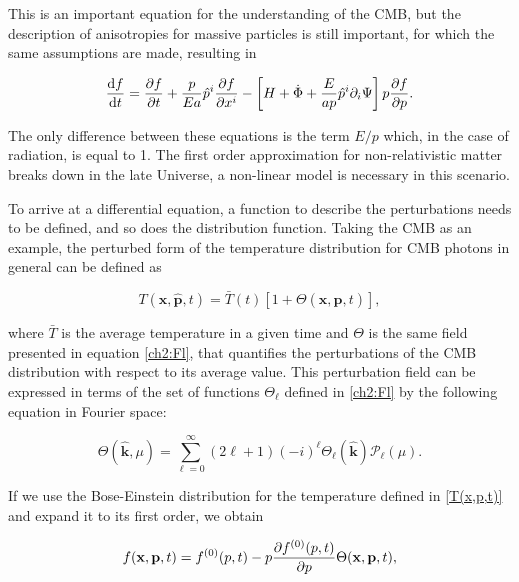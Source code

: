 \documentclass[openany,a4paper,12pt,oneside]{book}
\begin{document}
\begin{spacing}{1.5}
This is an important equation for the understanding of the CMB, but the description of anisotropies for massive particles is still important, for which the same assumptions are made, resulting in 

\begin{equation}\label{ch2:Boltzmann_matter_final}
    \dv{f}{t}=\pdv{f}{t}+\frac{p}{Ea}\hat{p}^i\pdv{f}{x^i}-\left[H+\dot{\Phi}+\frac{E}{ap}\hat{p}^i\partial_i\Psi\right]p\pdv{f}{p}.
\end{equation}

The only difference between these equations is the term $E/p$ which, in the case of radiation, is equal to 1. The first order approximation for non-relativistic matter breaks down in the late Universe, a non-linear model is necessary in this scenario. 

To arrive at a differential equation, a function to describe the perturbations needs to be defined, and so does the distribution function. Taking the CMB as an example, the perturbed form of the temperature distribution for CMB photons in general can be defined as

\begin{equation}\label{T(x,p,t)}
    T(\mathbf{x}, \hat{\mathbf{p}}, t)=\bar{T}(t)[1+\Theta(\mathbf{x}, \hat{\mathbf{p}}, t)],
\end{equation}

\noindent where $\bar{T}$ is the average temperature in a given time and $\Theta$ is the same field presented in equation \eqref{ch2:Fl}, that quantifies the perturbations of the CMB distribution with respect to its average value. This perturbation field can be expressed in terms of the set of functions $\Theta_\ell$ defined in \eqref{ch2:Fl} by the following equation in Fourier space:

\begin{equation}\label{Theta_&_Thetal}
    \Theta(\hat{\mathbf{k}}, \mu)=\sum_{\ell=0}^\infty (2\ell+1)(-i)^\ell \Theta_\ell(\hat{\mathbf{k}}) \mathcal{P}_\ell(\mu).
\end{equation}

If we use the Bose-Einstein distribution for the temperature defined in \eqref{T(x,p,t)} and expand it to its first order, we obtain 

\begin{equation}\label{f(x,p,t)_first_order}
    f(\mathbf{x}, \mathbf{p}, t)=f^{(0)}(p,t)-p\pdv{f^{(0)}(p,t)}{p}\Theta(\mathbf{x}, \mathbf{p}, t),
\end{equation}


\end{spacing}
\end{document}
